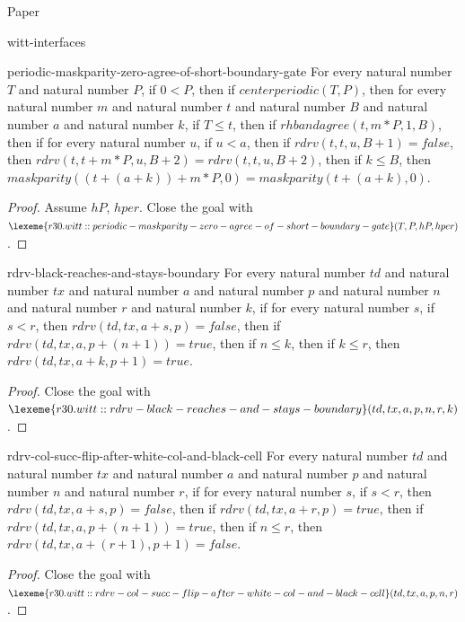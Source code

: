 \begin{lexlean}{Paper}
\begin{section}{witt-interfaces}
  \begin{theorem}{periodic-maskparity-zero-agree-of-short-boundary-gate}
  For every natural number \(T\) and natural number \(P\), if \(0 < P\), then if \(centerperiodic(T, P)\), then for every natural number \(m\) and natural number \(t\) and natural number \(B\) and natural number \(a\) and natural number \(k\), if \(T ≤ t\), then if \(rhbandagree(t, m * P, 1, B)\), then if for every natural number \(u\), if \(u < a\), then if \(rdrv(t, t, u, B + 1) = false\), then \(rdrv(t, t + m * P, u, B + 2) = rdrv(t, t, u, B + 2)\), then if \(k ≤ B\), then \(maskparity((t + (a + k)) + m * P, 0) = maskparity(t + (a + k), 0)\).
  \begin{proof}
  Assume \(hP\), \(hper\).
  Close the goal with \(\lexeme{r30.witt::periodic-maskparity-zero-agree-of-short-boundary-gate}(T, P, hP, hper)\).
  \end{proof}
  \end{theorem}

  \begin{theorem}{rdrv-black-reaches-and-stays-boundary}
  For every natural number \(td\) and natural number \(tx\) and natural number \(a\) and natural number \(p\) and natural number \(n\) and natural number \(r\) and natural number \(k\), if for every natural number \(s\), if \(s < r\), then \(rdrv(td, tx, a + s, p) = false\), then if \(rdrv(td, tx, a, p + (n + 1)) = true\), then if \(n ≤ k\), then if \(k ≤ r\), then \(rdrv(td, tx, a + k, p + 1) = true\).
  \begin{proof}
  Close the goal with \(\lexeme{r30.witt::rdrv-black-reaches-and-stays-boundary}(td, tx, a, p, n, r, k)\).
  \end{proof}
  \end{theorem}

  \begin{theorem}{rdrv-col-succ-flip-after-white-col-and-black-cell}
  For every natural number \(td\) and natural number \(tx\) and natural number \(a\) and natural number \(p\) and natural number \(n\) and natural number \(r\), if for every natural number \(s\), if \(s < r\), then \(rdrv(td, tx, a + s, p) = false\), then if \(rdrv(td, tx, a + r, p) = true\), then if \(rdrv(td, tx, a, p + (n + 1)) = true\), then if \(n ≤ r\), then \(rdrv(td, tx, a + (r + 1), p + 1) = false\).
  \begin{proof}
  Close the goal with \(\lexeme{r30.witt::rdrv-col-succ-flip-after-white-col-and-black-cell}(td, tx, a, p, n, r)\).
  \end{proof}
  \end{theorem}


\end{section}
\end{lexlean}
